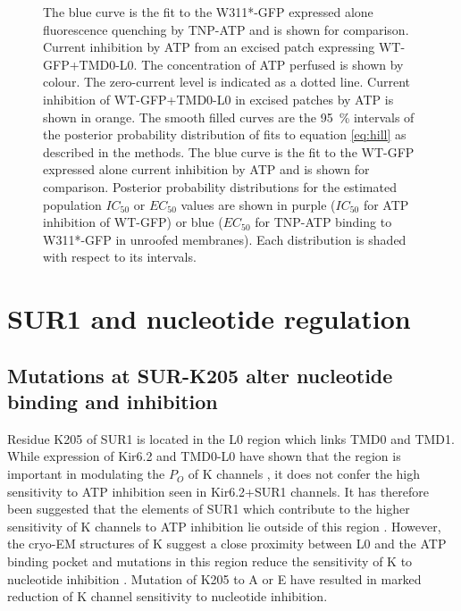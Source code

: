 \begin{figure}[h]
{	The blue curve is the fit to the W311*-GFP expressed alone fluorescence quenching by TNP-ATP and is shown for comparison.
	 Current inhibition by ATP from an excised patch expressing WT-GFP+TMD0-L0.
	The concentration of ATP perfused is shown by colour.
	The zero-current level is indicated as a dotted line.
	 Current inhibition of WT-GFP+TMD0-L0 in excised patches by ATP is shown in orange.
	The smooth filled curves are the \SI{95}{\percent} intervals of the posterior probability distribution of fits to equation \ref{eq:hill} as described in the methods.
	The blue curve is the fit to the WT-GFP expressed alone current inhibition by ATP and is shown for comparison.
	 Posterior probability distributions for the estimated population $IC_{50}$ or $EC_{50}$ values are shown in purple ($IC_{50}$ for ATP inhibition of WT-GFP) or blue ($EC_{50}$ for TNP-ATP binding to W311*-GFP in unroofed membranes).
	Each distribution is shaded with respect to its intervals.
	}\label{ch6fig:tmd0_binding}
\end{figure}

\section{SUR1 and nucleotide regulation}

\subsection{Mutations at SUR-K205 alter nucleotide binding and inhibition}

Residue K205 of SUR1 is located in the L0 region which links TMD0 and TMD1.
While expression of Kir6.2 and TMD0-L0 have shown that the region is important in modulating the $P_O$ of K\ATP{} channels \cite{babenko_sur_2003, chan_n-terminal_2003-1, pratt_n-terminal_2011}, it does not confer the high sensitivity to ATP inhibition seen in Kir6.2+SUR1 channels.
It has therefore been suggested that the elements of SUR1 which contribute to the higher sensitivity of K\ATP{} channels to ATP inhibition lie outside of this region \cite{babenko_sur_2003, pratt_engineered_2012-1}.
However, the cryo-EM structures of K\ATP{} suggest a close proximity between L0 and the ATP binding pocket \cite{martin_anti-diabetic_2017-1, lee_molecular_2017-1, li_structure_2017} and mutations in this region reduce the sensitivity of K\ATP{} to nucleotide inhibition \cite{ding_structural_2019,pratt_engineered_2012-1, masia_mutation_2007}.
Mutation of K205 to A \cite{ding_structural_2019} or E \cite{pratt_engineered_2012} have resulted in marked reduction of K\ATP{} channel sensitivity to nucleotide inhibition.


